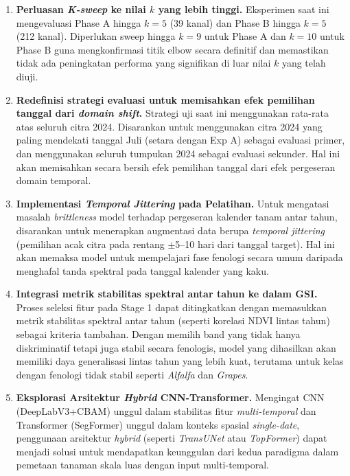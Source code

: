 \begin{enumerate}

    \item \textbf{Perluasan \textit{K-sweep} ke nilai $k$ yang lebih tinggi.}
    Eksperimen saat ini mengevaluasi Phase A hingga $k=5$ (39 kanal) dan Phase B hingga $k=5$ (212 kanal). Diperlukan sweep hingga $k=9$ untuk Phase A dan $k=10$ untuk Phase B guna mengkonfirmasi titik elbow secara definitif dan memastikan tidak ada peningkatan performa yang signifikan di luar nilai $k$ yang telah diuji.

    \item \textbf{Redefinisi strategi evaluasi untuk memisahkan efek pemilihan tanggal dari \textit{domain shift}.}
    Strategi uji saat ini menggunakan rata-rata atas seluruh citra 2024. Disarankan untuk menggunakan citra 2024 yang paling mendekati tanggal Juli (setara dengan Exp A) sebagai evaluasi primer, dan menggunakan seluruh tumpukan 2024 sebagai evaluasi sekunder. Hal ini akan memisahkan secara bersih efek pemilihan tanggal dari efek pergeseran domain temporal.

    \item \textbf{Implementasi \textit{Temporal Jittering} pada Pelatihan.}
    Untuk mengatasi masalah \textit{brittleness} model terhadap pergeseran kalender tanam antar tahun, disarankan untuk menerapkan augmentasi data berupa \textit{temporal jittering} (pemilihan acak citra pada rentang $\pm$5--10 hari dari tanggal target). Hal ini akan memaksa model untuk mempelajari fase fenologi secara umum daripada menghafal tanda spektral pada tanggal kalender yang kaku.

    \item \textbf{Integrasi metrik stabilitas spektral antar tahun ke dalam GSI.}
    Proses seleksi fitur pada Stage 1 dapat ditingkatkan dengan memasukkan metrik stabilitas spektral antar tahun (seperti korelasi NDVI lintas tahun) sebagai kriteria tambahan. Dengan memilih band yang tidak hanya diskriminatif tetapi juga stabil secara fenologis, model yang dihasilkan akan memiliki daya generalisasi lintas tahun yang lebih kuat, terutama untuk kelas dengan fenologi tidak stabil seperti \textit{Alfalfa} dan \textit{Grapes}.

    \item \textbf{Eksplorasi Arsitektur \textit{Hybrid} CNN-Transformer.}
    Mengingat CNN (DeepLabV3+CBAM) unggul dalam stabilitas fitur \textit{multi-temporal} dan Transformer (SegFormer) unggul dalam konteks spasial \textit{single-date}, penggunaan arsitektur \textit{hybrid} (seperti \textit{TransUNet} atau \textit{TopFormer}) dapat menjadi solusi untuk mendapatkan keunggulan dari kedua paradigma dalam pemetaan tanaman skala luas dengan input multi-temporal.

\end{enumerate}
